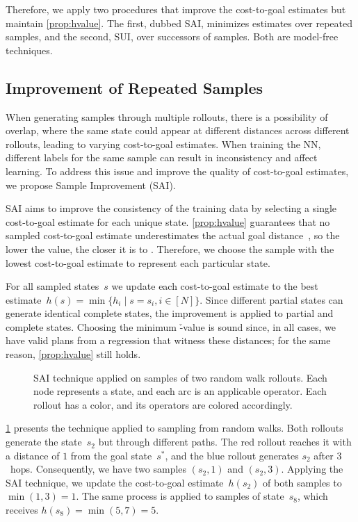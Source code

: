 Therefore, we apply two procedures that improve the cost-to-goal estimates but maintain \cref{prop:hvalue}. The first, dubbed SAI, minimizes estimates over repeated samples, and the second, SUI, over successors of samples. Both are model-free techniques.

\subsection{Improvement of Repeated Samples}
\label{sec:sai}

When generating samples through multiple rollouts, there is a possibility of overlap, where the same state could appear at different distances across different rollouts, leading to varying cost-to-goal estimates. When training the NN, different labels for the same sample can result in inconsistency and affect learning. To address this issue and improve the quality of cost-to-goal estimates, we propose Sample Improvement (SAI).

SAI aims to improve the consistency of the training data by selecting a single cost-to-goal estimate for each unique state. \cref{prop:hvalue} guarantees that no sampled cost-to-goal estimate underestimates the actual goal distance~\hstar, so the lower the value, the closer it is to \hstar. Therefore, we choose the sample with the lowest cost-to-goal estimate to represent each particular state.

For all sampled states~$s$ we update each cost-to-goal estimate to the best estimate~$h(s) = \min\{h_i \mid s=s_i, i\in[N]\}$. Since different partial states can generate identical complete states, the improvement is applied to partial and complete states. Choosing the minimum \h-value is sound since, in all cases, we have valid plans from a regression that witness these distances; for the same reason, \cref{prop:hvalue} still holds.

\begin{figure}[tb]
    \caption[SAI technique applied on samples of random walk rollouts.]{SAI technique applied on samples of two random walk rollouts. Each node represents a state, and each arc is an applicable operator. Each rollout has a color, and its operators are colored accordingly.}
    \label{fig:sai}
    \addmargin
    \centering
    
\end{figure}

\cref{fig:sai} presents the technique applied to sampling from random walks. Both rollouts generate the state~$s_2$ but through different paths. The red rollout reaches it with a distance of $1$ from the goal state~$s^*$, and the blue rollout generates $s_2$ after $3$~hops. Consequently, we have two samples $(s_2,1)$ and $(s_2,3)$. Applying the SAI technique, we update the cost-to-goal estimate~$h(s_2)$ of both samples to $\min(1,3)=1$. The same process is applied to samples of state~$s_8$, which receives $h(s_8)=\min(5,7)=5$.

